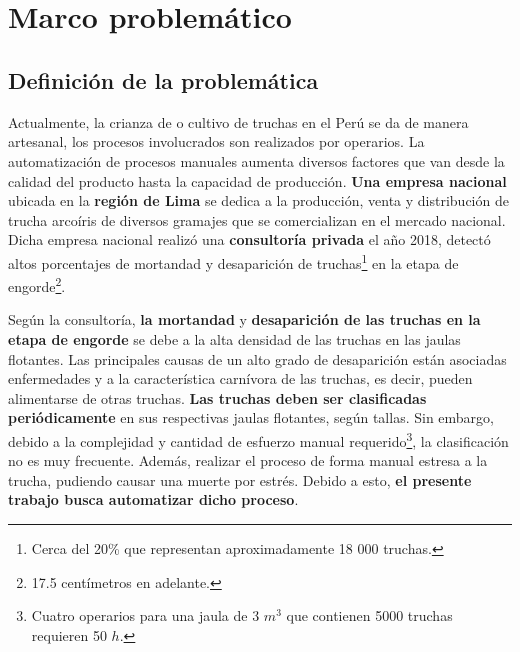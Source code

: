 
\pagestyle{myportland}
\doublespacing
\chapter[\quad\quad\quad\quad ----- Marco problemático]{\\ Marco problemático}
\thispagestyle{myportland}

\section{Definición de la problemática}

Actualmente, la crianza de o cultivo de truchas en el Perú se da de manera artesanal, los procesos involucrados son realizados por operarios. La automatización de procesos manuales aumenta diversos factores que van desde la calidad del producto hasta la capacidad de producción. \textbf{Una empresa nacional} ubicada en la \textbf{región de Lima} se dedica a la producción, venta y distribución de trucha arcoíris de diversos gramajes que se comercializan en el mercado nacional. Dicha empresa nacional realizó una \textbf{consultoría privada} el año 2018, detectó altos porcentajes de mortandad y desaparición de truchas\footnote{Cerca del 20\% que representan aproximadamente 18 000 truchas.} en la etapa de engorde\footnote{17.5 centímetros en adelante.}.

Según la consultoría, \textbf{la mortandad} y \textbf{desaparición de las truchas en la etapa de engorde} se debe a la alta densidad de las truchas en las jaulas flotantes. Las principales causas de un alto grado de desaparición están asociadas enfermedades y a la característica carnívora de las truchas, es decir, pueden alimentarse de otras truchas. \textbf{Las truchas deben ser clasificadas periódicamente} en sus respectivas jaulas flotantes, según tallas. Sin embargo, debido a la complejidad y cantidad de esfuerzo manual requerido\footnote{Cuatro operarios para una jaula de 3 $ m^3 $ que contienen 5000 truchas requieren 50 $ h $.}, la clasificación no es muy frecuente. Además, realizar el proceso de forma manual estresa a la trucha, pudiendo causar una muerte por estrés. Debido a esto, \textbf{el presente trabajo busca automatizar dicho proceso}.


